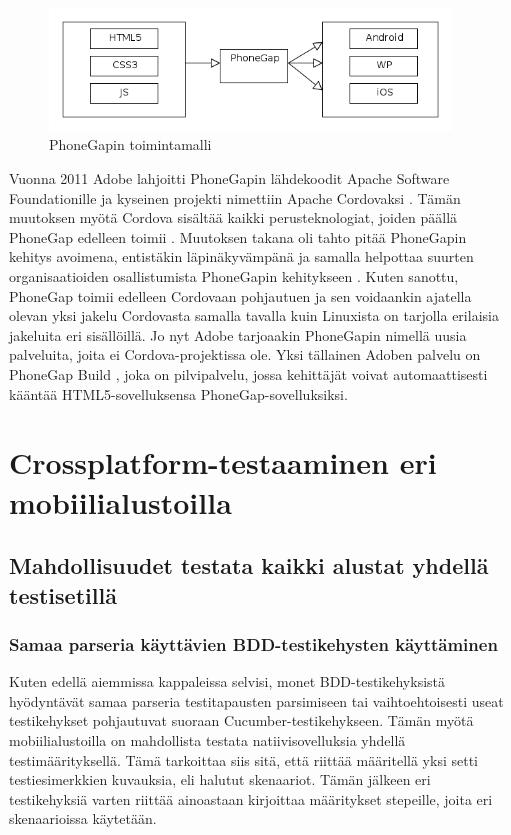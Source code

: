 \documentclass[finnish,nonumbib,nocopyright]{gradu2}
\begin{document}
\begin{figure}
\centering
\includegraphics[width=0.95\textwidth]{phonegap}
\caption{PhoneGapin toimintamalli \cite{phonegap}}
\end{figure}

Vuonna 2011 Adobe lahjoitti PhoneGapin lähdekoodit Apache Software Foundationille ja kyseinen projekti nimettiin Apache Cordovaksi \cite{cordova}. Tämän muutoksen myötä Cordova sisältää kaikki perusteknologiat, joiden päällä PhoneGap edelleen toimii \cite{cordovablog}. Muutoksen takana oli tahto pitää PhoneGapin kehitys avoimena, entistäkin läpinäkyvämpänä ja samalla helpottaa suurten organisaatioiden osallistumista PhoneGapin kehitykseen \cite{cordovablog}. Kuten sanottu, PhoneGap toimii edelleen Cordovaan pohjautuen ja sen voidaankin ajatella olevan yksi jakelu Cordovasta samalla tavalla kuin Linuxista on tarjolla erilaisia jakeluita eri sisällöillä. Jo nyt Adobe tarjoaakin PhoneGapin nimellä uusia palveluita, joita ei Cordova-projektissa ole. Yksi tällainen Adoben palvelu on PhoneGap Build \cite{phonegapbuild}, joka on pilvipalvelu, jossa kehittäjät voivat automaattisesti kääntää HTML5-sovelluksensa PhoneGap-sovelluksiksi.

\chapter{Crossplatform-testaaminen eri mobiilialustoilla}
\label{chap:platforms}

\section{Mahdollisuudet testata kaikki alustat yhdellä testisetillä}

\subsection{Samaa parseria käyttävien BDD-testikehysten käyttäminen}
Kuten edellä aiemmissa kappaleissa selvisi, monet BDD-testikehyksistä hyödyntävät samaa parseria testitapausten parsimiseen tai vaihtoehtoisesti useat testikehykset pohjautuvat suoraan Cucumber-testikehykseen. Tämän myötä mobiilialustoilla on mahdollista testata natiivisovelluksia yhdellä testimäärityksellä. Tämä tarkoittaa siis sitä, että riittää määritellä yksi setti testiesimerkkien kuvauksia, eli halutut skenaariot. Tämän jälkeen eri testikehyksiä varten riittää ainoastaan kirjoittaa määritykset stepeille, joita eri skenaarioissa käytetään.
\end{document}
